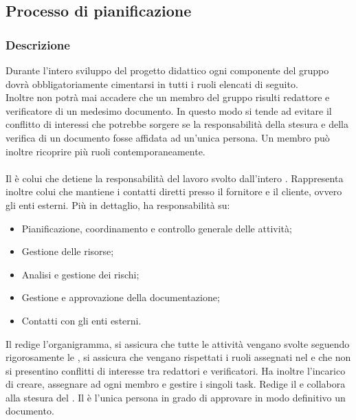 \subsection{Processo di pianificazione}

\subsubsection{Descrizione}
Durante l'intero sviluppo del progetto didattico ogni componente del gruppo 
dovrà obbligatoriamente cimentarsi in tutti i ruoli elencati di seguito. \\
Inoltre non potrà mai accadere che un membro del gruppo risulti redattore e verificatore di un medesimo documento. 
In questo modo si tende ad evitare il conflitto di interessi che potrebbe sorgere se la responsabilità della stesura e della verifica di un documento fosse affidata ad un'unica persona.
Un membro può inoltre ricoprire più ruoli contemporaneamente.

\paragraph{\RdP}
Il \textsl{\RdP} è colui che detiene la responsabilità del 
lavoro svolto dall'intero . Rappresenta inoltre colui che mantiene i 
contatti diretti presso il fornitore e il cliente, ovvero gli enti esterni. Più 
in dettaglio, ha responsabilità su:
\begin{itemize}
  \item Pianificazione, coordinamento e controllo generale delle attività;
  \item Gestione delle risorse;
  \item Analisi e gestione dei rischi;
  \item Gestione e approvazione della documentazione;
  \item Contatti con gli enti esterni.
\end{itemize}
Il \textsl{\RdP} redige l'organigramma, si assicura che 
tutte le attività vengano svolte seguendo rigorosamente le \textsl{\NdP}, si 
assicura che vengano rispettati i ruoli assegnati nel \textsl{\PdP} e che non si 
presentino conflitti di interesse tra redattori e verificatori. Ha inoltre 
l'incarico di creare, assegnare ad ogni membro e gestire i singoli task. Redige 
il \textsl{\PdP} e collabora alla stesura del \textsl{\PdQ}. Il \textsl{\RdP} è 
l'unica persona in grado di approvare in modo definitivo un documento.

